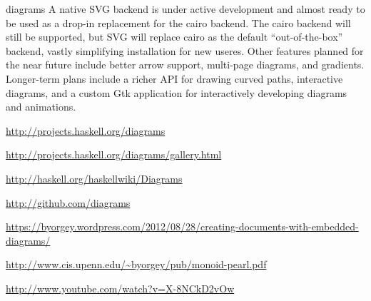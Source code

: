 \documentclass{article}
\begin{document}
\begin{hcarentry}[updated]{diagrams}
A native SVG backend is under active development and almost ready to
be used as a drop-in replacement for the cairo backend.  The cairo
backend will still be supported, but SVG will replace cairo as the
default ``out-of-the-box'' backend, vastly simplifying installation
for new useres. Other features planned for the near future include
better arrow support, multi-page diagrams, and gradients.  Longer-term
plans include a richer API for drawing curved paths, interactive
diagrams, and a custom Gtk application for interactively developing
diagrams and animations.

\FurtherReading
\begin{compactitem}
\item \url{http://projects.haskell.org/diagrams}
\item \url{http://projects.haskell.org/diagrams/gallery.html}
\item \url{http://haskell.org/haskellwiki/Diagrams}
\item \url{http://github.com/diagrams}
\item
  \url{https://byorgey.wordpress.com/2012/08/28/creating-documents-with-embedded-diagrams/}
\item \url{http://www.cis.upenn.edu/~byorgey/pub/monoid-pearl.pdf}
\item \url{http://www.youtube.com/watch?v=X-8NCkD2vOw}
\end{compactitem}
\end{hcarentry}
\end{document}
